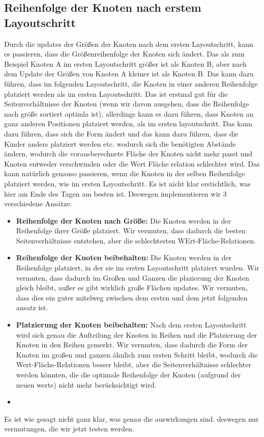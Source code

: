 \subsection{Reihenfolge der Knoten nach erstem Layoutschritt} \label{sec:ReihenfolgeKnotenErstesLayout}
Durch die updates der Größen der Knoten nach dem ersten Layoutschritt, kann es passieren, dass die Größenreihenfolge der Knoten sich ändert. Das als zum Beispiel Knoten A im ersten Layoutschritt größer ist als Knoten B, aber nach dem Update der Größen von Knoten A kleiner ist als Knoten B. Das kann dazu führen, dass im folgenden Layoutschritt, die Knoten in einer anderen Reihenfolge platziert werden als im ersten Layoutschritt. 
Das ist erstmal gut für die Seitenverhältnisse der Knoten (wenn wir davon ausgehen, dass die Reihenfolge nach größe sortiert optimla ist), allerdings kann es dazu führen, dass Knoten an ganz anderen Positionen platziert werden, als im ersten layoutschritt. Das  kann dazu führen, dass sich die Form ändert und das kann dazu führen, dass die Kinder anders platziert werden etc. wodurch sich die benötigten Abstände ändern, wodurch die vorausberechnete Fläche der Knoten nicht mehr passt und Knoten entweder verschwinden oder die Wert Fläche relation schlechter wird.
Das kann natürlich genauso passieren, wenn die Knoten in der selben Reihenfolge platziert werden, wie im ersten Layoutschritt. Es ist nicht klar erstichtlich, was hier am Ende des Tagen am besten ist. Deswegen implementieren wir 3 verschiedene Ansätze:
\begin{itemize}
    \item \textbf{Reihenfolge der Knoten nach Größe:} Die Knoten werden in der Reihenfolge ihrer Größe platziert. Wir vermuten, dass dadurch die besten Seitenverhältnisse entstehen, aber die schlechtesten WErt-Fläche-Relationen.
    \item \textbf{Reihenfolge der Knoten beibehalten:} Die Knoten werden in der Reihenfolge platziert, in der sie im ersten Layoutschritt platziert wurden. Wir vermuten, dass dadurch im Großen und Ganzen die plazierung der Knoten gleich bleibt, außer es gibt wirklich große Flächen updates. Wir vermuten, dass dies ein guter mitelweg zwischen dem ersten und dem jetzt folgenden ansatz ist.
    \item \textbf{Platzierung der Knoten beibehalten:} Nach dem ersten Layoutschritt wird sich genau die Aufteilung der Knoten in Reihen und die Platzierung der Knoten in den Reihen gemerkt. Wir vermuten, dass dadurch die Form der Knoten im großen und ganzen ähnlich zum ersten Schritt bleibt, wodurch die Wert-Fläche-Relationen besser bleibt, aber die Seitenverhältnisse schlechter werden könnten, die die optimale Reihenfolge der Knoten (aufgrund der neuen werte) nicht mehr berücksichtigt wird.
    \item 
\end{itemize} 
Es ist wie gesagt nicht ganz klar, was genau die auswirkungen sind. deswegen nur vermutungen, die wir jetzt testen werden.




